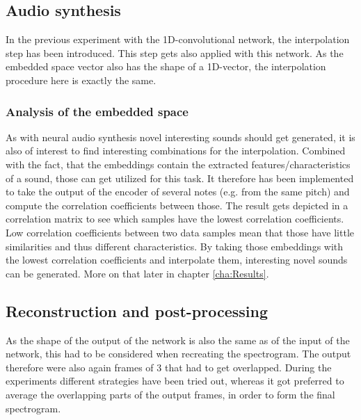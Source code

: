 \subsection{Audio synthesis}
In the previous experiment with the 1D-convolutional network, the interpolation step has been introduced. This step gets also applied with this network. As the embedded space vector also has the shape of a 1D-vector, the interpolation procedure here is exactly the same. 

\subsubsection{Analysis of the embedded space}
As with neural audio synthesis novel interesting sounds should get generated, it is also of interest to find interesting combinations for the interpolation. Combined with the fact, that the embeddings contain the extracted features/characteristics of a sound, those can get utilized for this task. It therefore has been implemented to take the output of the encoder of several notes (e.g. from the same pitch) and compute the correlation coefficients between those. The result gets depicted in a correlation matrix to see which samples have the lowest correlation coefficients. Low correlation coefficients between two data samples mean that those have little similarities and thus different characteristics. By taking those embeddings with the lowest correlation coefficients and interpolate them, interesting novel sounds can be generated. More on that later in chapter \ref{cha:Results}.

\subsection{Reconstruction and post-processing}
As the shape of the output of the network is also the same as of the input of the network, this had to be considered when recreating the spectrogram. The output therefore were also again frames of 3 that had to get overlapped. During the experiments different strategies have been tried out, whereas it got preferred to average the overlapping parts of the output frames, in order to form the final spectrogram.

